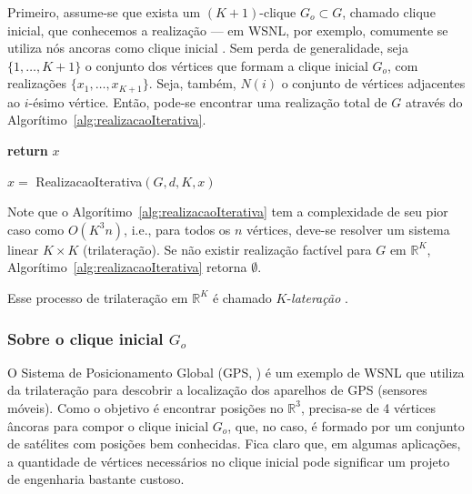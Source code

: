 Primeiro, assume-se que exista um $(K+1)$-clique $G_o \subset G$, chamado clique inicial, que conhecemos a realização --- em WSNL, por exemplo, comumente se utiliza nós ancoras como clique inicial \cite{eren2004rigidity, savvides2001dynamic}. Sem perda de generalidade, seja $\{1,\dots,K+1\}$ o conjunto dos vértices que formam a clique inicial $G_o$, com realizações $\{x_1, \dots,x_{K+1}\}$. Seja, também, $N(i)$ o conjunto de vértices adjacentes ao $i$-ésimo vértice. Então, pode-se encontrar uma realização total de $G$ através do Algorítimo~\ref{alg:realizacaoIterativa}. 
\\

\begin{algorithm}[H]
	\label{alg:realizacaoIterativa}
	\textbf{return} $x$\;
	\caption{$x =$ RealizacaoIterativa$(G,d, K, x)$ \cite{libertiEDG}}
\end{algorithm}
\vspace{0.5cm}
Note que o Algorítimo~\ref{alg:realizacaoIterativa} tem a complexidade de seu pior caso como $O(K^3n)$, i.e., para todos os $n$ vértices, deve-se resolver um sistema linear $K\times K$ (trilateração). Se não existir realização factível para $G$ em $\mathbb{R}^K$, Algorítimo~\ref{alg:realizacaoIterativa} retorna $\emptyset$.

Esse processo de trilateração em $\mathbb{R}^K$ é chamado $K$-\textit{lateração} \cite{eren2004rigidity, libertiEDG}.

\subsubsection{Sobre o clique inicial $G_o$}
O Sistema de Posicionamento Global (GPS,  \cite{gps}) é um exemplo de WSNL que utiliza da trilateração para descobrir a localização dos aparelhos de GPS (sensores móveis). Como o objetivo é encontrar posições no $\mathbb{R}^3$, precisa-se de 4 vértices âncoras para compor o clique inicial $G_o$, que, no caso, é formado por um conjunto de satélites com posições bem conhecidas. Fica claro que, em algumas aplicações, a quantidade de vértices necessários no clique inicial pode significar um projeto de engenharia bastante custoso.


